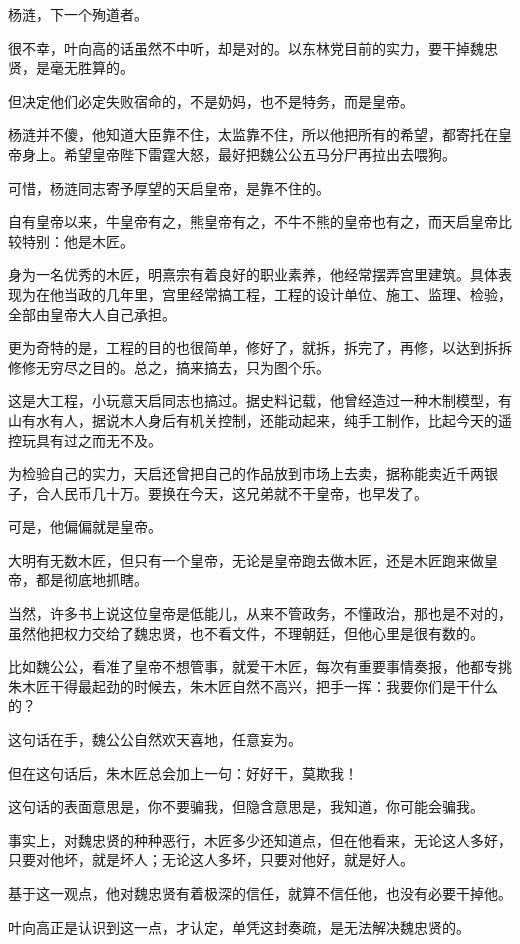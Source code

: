 \begin{multicols}{\theparacolNo}
杨涟，下一个殉道者。

很不幸，叶向高的话虽然不中听，却是对的。以东林党目前的实力，要干掉魏忠贤，是毫无胜算的。

但决定他们必定失败宿命的，不是奶妈，也不是特务，而是皇帝。

杨涟并不傻，他知道大臣靠不住，太监靠不住，所以他把所有的希望，都寄托在皇帝身上。希望皇帝陛下雷霆大怒，最好把魏公公五马分尸再拉出去喂狗。

可惜，杨涟同志寄予厚望的天启皇帝，是靠不住的。

自有皇帝以来，牛皇帝有之，熊皇帝有之，不牛不熊的皇帝也有之，而天启皇帝比较特别：他是木匠。

身为一名优秀的木匠，明熹宗有着良好的职业素养，他经常摆弄宫里建筑。具体表现为在他当政的几年里，宫里经常搞工程，工程的设计单位、施工、监理、检验，全部由皇帝大人自己承担。

更为奇特的是，工程的目的也很简单，修好了，就拆，拆完了，再修，以达到拆拆修修无穷尽之目的。总之，搞来搞去，只为图个乐。

这是大工程，小玩意天启同志也搞过。据史料记载，他曾经造过一种木制模型，有山有水有人，据说木人身后有机关控制，还能动起来，纯手工制作，比起今天的遥控玩具有过之而无不及。

为检验自己的实力，天启还曾把自己的作品放到市场上去卖，据称能卖近千两银子，合人民币几十万。要换在今天，这兄弟就不干皇帝，也早发了。

可是，他偏偏就是皇帝。

大明有无数木匠，但只有一个皇帝，无论是皇帝跑去做木匠，还是木匠跑来做皇帝，都是彻底地抓瞎。

当然，许多书上说这位皇帝是低能儿，从来不管政务，不懂政治，那也是不对的，虽然他把权力交给了魏忠贤，也不看文件，不理朝廷，但他心里是很有数的。

比如魏公公，看准了皇帝不想管事，就爱干木匠，每次有重要事情奏报，他都专挑朱木匠干得最起劲的时候去，朱木匠自然不高兴，把手一挥：我要你们是干什么的？

这句话在手，魏公公自然欢天喜地，任意妄为。

但在这句话后，朱木匠总会加上一句：好好干，莫欺我！

这句话的表面意思是，你不要骗我，但隐含意思是，我知道，你可能会骗我。

事实上，对魏忠贤的种种恶行，木匠多少还知道点，但在他看来，无论这人多好，只要对他坏，就是坏人；无论这人多坏，只要对他好，就是好人。

基于这一观点，他对魏忠贤有着极深的信任，就算不信任他，也没有必要干掉他。

叶向高正是认识到这一点，才认定，单凭这封奏疏，是无法解决魏忠贤的。


\end{multicols}
